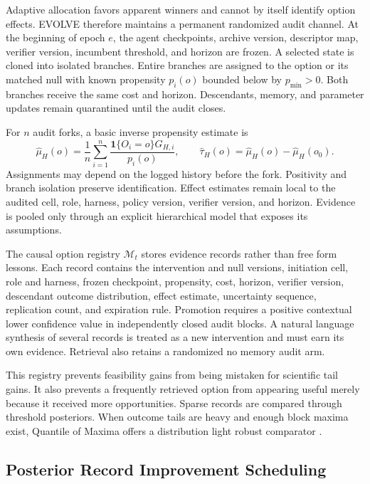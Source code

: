 \documentclass{article}
\newcommand{\Registry}{\mathcal{M}}
\newcommand{\ind}{\mathbf{1}}
\begin{document}
Adaptive allocation favors apparent winners and cannot by itself identify option effects. EVOLVE therefore maintains a permanent randomized audit channel. At the beginning of epoch $e$, the agent checkpoints, archive version, descriptor map, verifier version, incumbent threshold, and horizon are frozen. A selected state is cloned into isolated branches. Entire branches are assigned to the option or its matched null with known propensity $p_i(o)$ bounded below by $p_{\min}>0$. Both branches receive the same cost and horizon. Descendants, memory, and parameter updates remain quarantined until the audit closes.

For $n$ audit forks, a basic inverse propensity estimate is
\begin{equation}
\widehat\mu_H(o)
=
\frac{1}{n}
\sum_{i=1}^{n}
\frac{\ind\{O_i=o\}G_{H,i}}{p_i(o)},
\qquad
\widehat\tau_H(o)
=
\widehat\mu_H(o)-\widehat\mu_H(o_0).
\label{eqipw}
\end{equation}
Assignments may depend on the logged history before the fork. Positivity and branch isolation preserve identification. Effect estimates remain local to the audited cell, role, harness, policy version, verifier version, and horizon. Evidence is pooled only through an explicit hierarchical model that exposes its assumptions.

The causal option registry $\Registry_t$ stores evidence records rather than free form lessons. Each record contains the intervention and null versions, initiation cell, role and harness, frozen checkpoint, propensity, cost, horizon, verifier version, descendant outcome distribution, effect estimate, uncertainty sequence, replication count, and expiration rule. Promotion requires a positive contextual lower confidence value in independently closed audit blocks. A natural language synthesis of several records is treated as a new intervention and must earn its own evidence. Retrieval also retains a randomized no memory audit arm.

This registry prevents feasibility gains from being mistaken for scientific tail gains. It also prevents a frequently retrieved option from appearing useful merely because it received more opportunities. Sparse records are compared through threshold posteriors. When outcome tails are heavy and enough block maxima exist, Quantile of Maxima offers a distribution light robust comparator \citep{baudry2022}.

\subsection{Posterior Record Improvement Scheduling}
\label{secscheduler}
\end{document}
